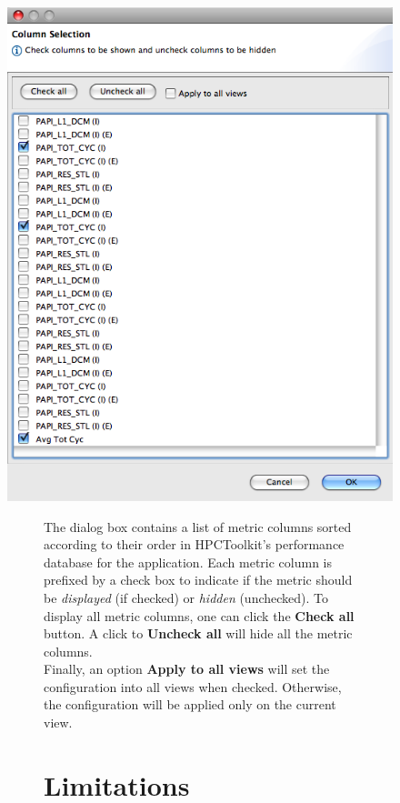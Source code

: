 \documentclass[a4paper,11pt]{article}
\begin{document}
\begin{figure}
\begin{center}
\includegraphics{images/HideShowColumns.png}
\caption{Hide/Show columns dialog box}
\end{center}
\begin{figure}

 The dialog box contains a list of metric columns sorted according to their order in HPCToolkit's performance database for the application. Each metric column is prefixed by a check box to indicate if the metric should be \textit{displayed} (if checked) or \textit{hidden} (unchecked). To display all metric columns, one can click the \textbf{Check all} button. A click to \textbf{Uncheck all} will hide all the metric columns.
\\ Finally, an option \textbf{Apply to all views} will set the configuration into all views when checked.  Otherwise, the configuration will be applied only on the current view.  

\section{Limitations}


\end{figure}
\end{figure}
\end{document}
